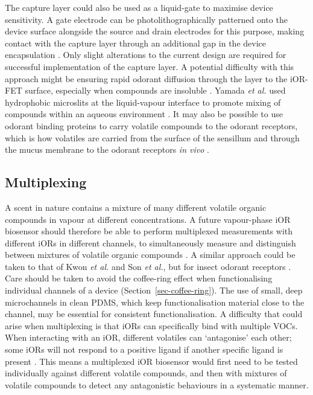 \documentclass[
  a4paper,
]{scrbook}
\begin{document}
The capture layer could also be used as a liquid-gate to maximise device
sensitivity. A gate electrode can be photolithographically patterned
onto the device surface alongside the source and drain electrodes for
this purpose, making contact with the capture layer through an
additional gap in the device encapsulation \autocite{Shkodra2021}. Only
slight alterations to the current design are required for successful
implementation of the capture layer. A potential difficulty with this
approach might be ensuring rapid odorant diffusion through the layer to
the iOR-FET surface, especially when compounds are insoluble
\autocite{Yamada2021,Hurot2020,Warden2019,Cali2020,Lee2015,Spencer2021}.
Yamada \emph{et al.} used hydrophobic microslits at the liquid-vapour
interface to promote mixing of compounds within an aqueous environment
\autocite{Yamada2021}. It may also be possible to use odorant binding
proteins to carry volatile compounds to the odorant receptors, which is
how volatiles are carried from the surface of the sensillum and through
the mucus membrane to the odorant receptors \emph{in vivo}
\autocite{Larisika2015,Kotlowski2018,Brito2016,Cali2020,Pelosi2018,Sankaran2011}.

\hypertarget{multiplexing}{%
\subsection{Multiplexing}\label{multiplexing}}

A scent in nature contains a mixture of many different volatile organic
compounds in vapour at different concentrations. A future vapour-phase
iOR biosensor should therefore be able to perform multiplexed
measurements with different iORs in different channels, to
simultaneously measure and distinguish between mixtures of volatile
organic compounds \autocite{Kwon2015,Bachtiar2016,Hurot2020,Hirata2021}.
A similar approach could be taken to that of Kwon \emph{et al.} and Son
\emph{et al.}, but for insect odorant receptors
\autocite{Kwon2015,Son2017}. Care should be taken to avoid the
coffee-ring effect when functionalising individual channels of a device
(Section~\ref{sec-coffee-ring}). The use of small, deep microchannels in
clean PDMS, which keep functionalisation material close to the channel,
may be essential for consistent functionalisation. A difficulty that
could arise when multiplexing is that iORs can specifically bind with
multiple VOCs. When interacting with an iOR, different volatiles can
`antagonise' each other; some iORs will not respond to a positive ligand
if another specific ligand is present
\autocite{Kwon2015,Son2017,Munch2016,Hirata2021}. This means a
multiplexed iOR biosensor would first need to be tested individually
against different volatile compounds, and then with mixtures of volatile
compounds to detect any antagonistic behaviours in a systematic manner.
\end{document}
